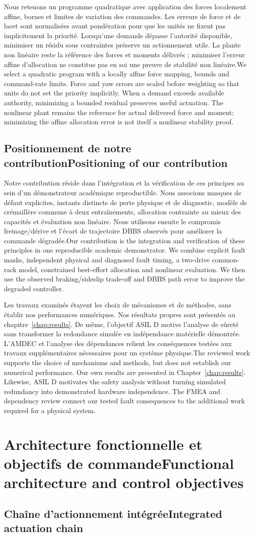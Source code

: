 \documentclass[11pt,a4paper,oneside]{report}
\newcommand{\bi}[2]{\iffrench #2\else #1\fi}
\newcommand{\chap}[2]{\chapter{\bi{#1}{#2}}}
\renewcommand{\sec}[2]{\section{\bi{#1}{#2}}}
\begin{document}
\bi{We select a quadratic program with a locally affine force mapping, bounds and command-rate limits. Force and yaw errors are scaled before weighting so that units do not set the priority implicitly. When a demand exceeds available authority, minimizing a bounded residual preserves useful actuation. The nonlinear plant remains the reference for actual delivered force and moment; minimizing the affine allocation error is not itself a nonlinear stability proof.}{Nous retenons un programme quadratique avec application des forces localement affine, bornes et limites de variation des commandes. Les erreurs de force et de lacet sont normalisées avant pondération pour que les unités ne fixent pas implicitement la priorité. Lorsqu'une demande dépasse l'autorité disponible, minimiser un résidu sous contraintes préserve un actionnement utile. La plante non linéaire reste la référence des forces et moments délivrés ; minimiser l'erreur affine d'allocation ne constitue pas en soi une preuve de stabilité non linéaire.}

\sec{Positioning of our contribution}{Positionnement de notre contribution}
\bi{Our contribution is the integration and verification of these principles in one reproducible academic demonstrator. We combine explicit fault masks, independent physical and diagnosed fault timing, a two-drive common-rack model, constrained best-effort allocation and nonlinear evaluation. We then use the observed braking/sideslip trade-off and DBBS path error to improve the degraded controller.}{Notre contribution réside dans l'intégration et la vérification de ces principes au sein d'un démonstrateur académique reproductible. Nous associons masques de défaut explicites, instants distincts de perte physique et de diagnostic, modèle de crémaillère commune à deux entraînements, allocation contrainte au mieux des capacités et évaluation non linéaire. Nous utilisons ensuite le compromis freinage/dérive et l'écart de trajectoire DBBS observés pour améliorer la commande dégradée.}

\bi{The reviewed work supports the choice of mechanisms and methods, but does not establish our numerical performance. Our own results are presented in Chapter~\ref{chap:results}. Likewise, ASIL D motivates the safety analysis without turning simulated redundancy into demonstrated hardware independence. The FMEA and dependency review connect our tested fault consequences to the additional work required for a physical system.}{Les travaux examinés étayent les choix de mécanismes et de méthodes, sans établir nos performances numériques. Nos résultats propres sont présentés au chapitre~\ref{chap:results}. De même, l'objectif ASIL D motive l'analyse de sûreté sans transformer la redondance simulée en indépendance matérielle démontrée. L'AMDEC et l'analyse des dépendances relient les conséquences testées aux travaux supplémentaires nécessaires pour un système physique.}
\chap{Functional architecture and control objectives}{Architecture fonctionnelle et objectifs de commande}
\sec{Integrated actuation chain}{Chaîne d'actionnement intégrée}
\end{document}
